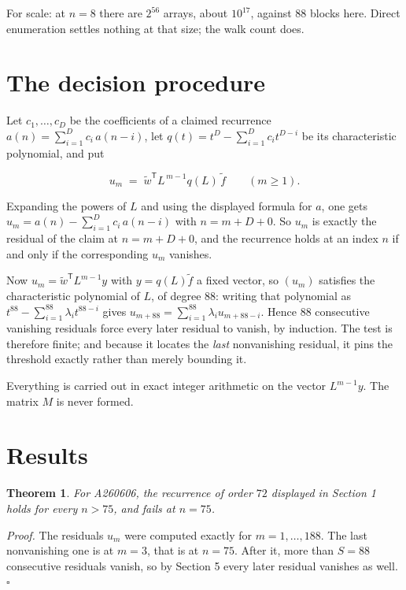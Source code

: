 \documentclass[11pt]{article}
\newtheorem{theorem}{Theorem}
\theoremstyle{definition}
\begin{document}
For scale: at $n = 8$ there are $2^{56}$ arrays, about $10^{17}$, against $88$ blocks here. Direct enumeration settles nothing at that size; the walk count does.

\section{The decision procedure}

Let $c_1,\dots,c_D$ be the coefficients of a claimed recurrence $a(n) = \sum_{i=1}^{D} c_i\,a(n-i)$, let $q(t) = t^{D} - \sum_{i=1}^{D} c_i t^{D-i}$ be its characteristic polynomial, and put

\[u_m \;=\; \tilde w^{\mathsf T} L^{\,m-1} q(L)\,\tilde f \qquad (m \ge 1).\]

Expanding the powers of $L$ and using the displayed formula for $a$, one gets $u_m = a(n) - \sum_{i=1}^{D} c_i\,a(n-i)$ with $n = m + D + 0$. So $u_m$ is exactly the residual of the claim at $n = m + D + 0$, and the recurrence holds at an index $n$ if and only if the corresponding $u_m$ vanishes.

Now $u_m = \tilde w^{\mathsf T} L^{m-1} y$ with $y = q(L)\tilde f$ a fixed vector, so $(u_m)$ satisfies the characteristic polynomial of $L$, of degree $88$: writing that polynomial as $t^{88} - \sum_{i=1}^{88} \lambda_i t^{88-i}$ gives $u_{m+88} = \sum_{i=1}^{88} \lambda_i u_{m+88-i}$. Hence $88$ consecutive vanishing residuals force every later residual to vanish, by induction. The test is therefore finite; and because it locates the {\itshape last} nonvanishing residual, it pins the threshold exactly rather than merely bounding it.

Everything is carried out in exact integer arithmetic on the vector $L^{m-1}y$. The matrix $M$ is never formed.

\section{Results}

\begin{theorem} For A260606, the recurrence of order $72$ displayed in Section 1 holds for every $n > 75$, and fails at $n = 75$.\end{theorem}

{\itshape Proof.} The residuals $u_m$ were computed exactly for $m = 1,\dots,188$. The last nonvanishing one is at $m = 3$, that is at $n = 75$. After it, more than $S = 88$ consecutive residuals vanish, so by Section 5 every later residual vanishes as well. $\square$
\end{document}
